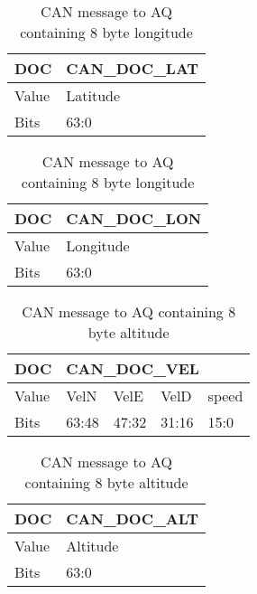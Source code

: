 \begin{multicols}{2}
\begin{table}[H]
	\begin{tabular}{@{}|l|l|@{}}
		\toprule
		DOC   & CAN\_DOC\_LAT \\ \midrule
		Value & Latitude      \\ \midrule
		Bits  & 63:0          \\ \bottomrule
	\end{tabular}
	\caption{CAN message to \ac{AQ} containing 8 byte latitude}	\label{tab:CAN_DOC_LAT}

	\begin{tabular}{@{}|l|l|@{}}
	\toprule
		DOC   & CAN\_DOC\_LON \\ \midrule
		Value & Longitude     \\ \midrule
		Bits  & 63:0          \\ \bottomrule
	\end{tabular}
	\caption{CAN message to \ac{AQ} containing 8 byte longitude} 	\label{tab:CAN_DOC_LON}

\end{table}
\columnbreak
\begin{table}[H]
	\begin{tabular}{@{}|l|l|l|l|l|@{}}
		\toprule
		DOC   & \multicolumn{4}{l|}{CAN\_DOC\_VEL} \\ \midrule
		Value & VelN    & VelE   & VelD   & speed  \\ \midrule
		Bits  & 63:48   & 47:32  & 31:16  & 15:0   \\ \bottomrule
	\end{tabular}
	\caption{CAN message to \ac{AQ} containing velocities each of 2 bytes}
	\label{tab:CAN_DOC_VEL}
	\begin{tabular}{@{}|l|l|@{}}
	\toprule
		DOC   & CAN\_DOC\_ALT \\ \midrule
		Value & Altitude      \\ \midrule
		Bits  & 63:0          \\ \bottomrule
	\end{tabular}
	\caption{CAN message to \ac{AQ} containing 8 byte altitude}
	\label{tab:CAN_DOC_ALT}
\end{table}
\end{multicols}

